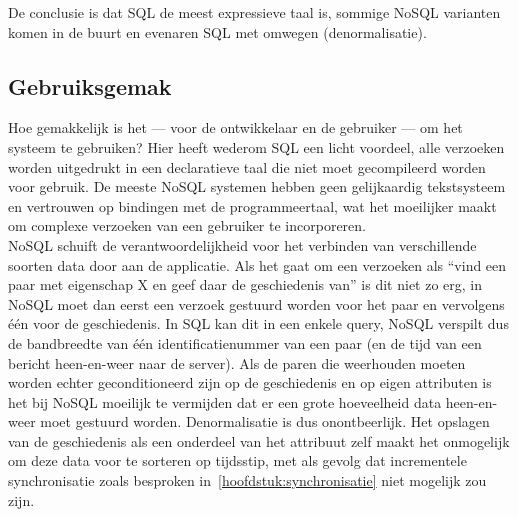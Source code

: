 De conclusie is dat SQL de meest expressieve taal is, sommige NoSQL varianten komen in de buurt en evenaren SQL met omwegen (denormalisatie).

\subsection{Gebruiksgemak}
Hoe gemakkelijk is het --- voor de ontwikkelaar en de gebruiker --- om het systeem te gebruiken? Hier heeft wederom SQL een licht voordeel, alle verzoeken worden uitgedrukt in een declaratieve taal die niet moet gecompileerd worden voor gebruik. De meeste NoSQL systemen hebben geen gelijkaardig tekstsysteem en vertrouwen op bindingen met de programmeertaal, wat het moeilijker maakt om complexe verzoeken van een gebruiker te incorporeren.\\

NoSQL schuift de verantwoordelijkheid voor het verbinden van verschillende soorten data door aan de applicatie. Als het gaat om een verzoeken als ``vind een paar met eigenschap X en geef daar de geschiedenis van'' is dit niet zo erg, in NoSQL moet dan eerst een verzoek gestuurd worden voor het paar en vervolgens \'e\'en voor de geschiedenis. In SQL kan dit in een enkele query, NoSQL verspilt dus de bandbreedte van \'e\'en identificatienummer van een paar (en de tijd van een bericht heen-en-weer naar de server). Als de paren die weerhouden moeten worden echter geconditioneerd zijn op de geschiedenis en op eigen attributen is het bij NoSQL moeilijk te vermijden dat er een grote hoeveelheid data heen-en-weer moet gestuurd worden. Denormalisatie is dus onontbeerlijk. Het opslagen van de geschiedenis als een onderdeel van het attribuut zelf maakt het onmogelijk om deze data voor te sorteren op tijdsstip, met als gevolg dat incrementele synchronisatie zoals besproken in~\ref{hoofdstuk:synchronisatie} niet mogelijk zou zijn.


